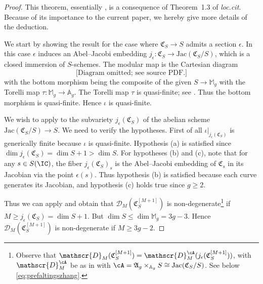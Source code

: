 \begin{proof}
This theorem, essentially \cite[Theorem~1.2']{GaoBettiRank}, is a consequence of Theorem~1.3 of \textit{loc.cit.} Because of its importance to the current paper, we hereby give more details of the deduction.

We start by showing the result for the case where $\mathfrak{C}_S
\rightarrow S$ admits a section $\epsilon$. %
In this case $\epsilon$ induces an Abel--Jacobi embedding $j_{\epsilon} \colon \mathfrak{C}_S \rightarrow \mathrm{Jac}(\mathfrak{C}_S/S)$, which is a closed immersion of $S$-schemes. The modular map is the Cartesian diagram
\[
\text{[Diagram omitted; see source PDF.]}
\]
with the bottom morphism being the composite of the given $S \rightarrow \mathbb{M}_g$ with the Torelli map $\tau \colon \mathbb{M}_g \rightarrow \mathbb{A}_g$. The Torelli map $\tau$ is quasi-finite; see \cite[Lemma 1.11]{OortSteenbrink}. Thus the bottom morphism is quasi-finite. Hence $\iota$ is quasi-finite.

We wish to apply \cite[Theorem~1.3]{GaoBettiRank} to the subvariety $j_{\epsilon}(\mathfrak{C}_S)$ of the abelian scheme $\mathrm{Jac}(\mathfrak{C}_S/S) \rightarrow S$. We need to verify the hypotheses. First of all $\iota|_{j_{\epsilon}(\mathfrak{C}_S)}$ is generically finite because $\iota$ is quasi-finite. Hypothesis (a) is satisfied since $\dim j_{\epsilon}(\mathfrak{C}_S) = \dim S + 1 > \dim S$. For hypotheses (b) and (c), note that for any $s\in S(\IC)$, the fiber $j_{\epsilon}(\mathfrak{C}_S)_s$ is the Abel--Jacobi embedding of $\mathfrak{C}_s$ in its Jacobian via the point $\epsilon(s)$. Thus hypothesis (b) is satisfied because each curve generates its Jacobian, and hypothesis (c) holds true since $g \ge 2$.

Thus we can apply \cite[Theorem~1.3.(ii)]{GaoBettiRank} and obtain that $\mathscr{D}_M(\mathfrak{C}_S^{[M+1]})$ is non-degenerate\footnote{Observe that $\mathscr{D}_M(\mathfrak{C}_S^{[M+1]}) = \mathscr{D}_M^{\cA}(j_{\epsilon}(\mathfrak{C}_S^{[M+1]}))$, with $\mathscr{D}_M^{\cA}$ be as in \cite[Theorem~1.3.(ii)]{GaoBettiRank} with $\cA = \mathfrak{A}_g\times_{\mathbb{A}_g}S \cong \mathrm{Jac}(\mathfrak{C}_S/S)$. See below \eqref{eq:prefaltingszhang}.} if $M \ge j_{\epsilon}(\mathfrak{C}_S) = \dim S + 1$. But $\dim S \le \dim \mathbb{M}_g = 3g-3$. Hence  $\mathscr{D}_M(\mathfrak{C}_S^{[M+1]})$ is non-degenerate if $M \ge 3g-2$.


\end{proof}
